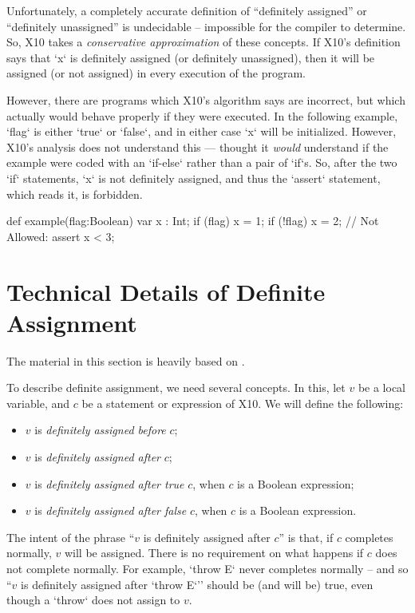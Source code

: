 Unfortunately, a completely accurate definition of ``definitely assigned''
or ``definitely unassigned'' is undecidable -- impossible for the compiler to
determine.  So, X10 takes a {\em conservative approximation} of these
concepts.  If X10's definition says that \xcd`x` is definitely assigned (or
definitely unassigned), then it will be assigned (or not assigned) in every
execution of the program.  

However, there are programs which X10's algorithm says are incorrect, but
which actually would behave properly if they were executed.   In the following
example, \xcd`flag` is either \xcd`true` or \xcd`false`, and in either case
\xcd`x` will be initialized.  However, X10's analysis does not understand this
--- thought it {\em would} understand if the example were coded with an
\xcd`if-else` rather than a pair of \xcd`if`s.  So, after the two \xcd`if`
statements, \xcd`x` is not definitely assigned, and thus the \xcd`assert`
statement, which reads it, is forbidden.  
\begin{xten}
def example(flag:Boolean) {
  var x : Int;
  if (flag) x = 1;
  if (!flag) x = 2;
  // Not Allowed: assert x < 3;
}
\end{xten}

\section{Technical Details of Definite Assignment}

The material in this section is heavily based on \cite{Java-lang-spec}.

To describe definite assignment, we need several concepts.  In this, let $v$
be a local variable, and $c$ be a statement or expression of X10.  We will define
the following: 
\begin{itemize}
\item $v$ is {\em definitely assigned before } $c$;
\item $v$ is {\em definitely assigned after } $c$;
\item $v$ is {\em definitely assigned after true } $c$, when $c$ is a Boolean expression;
\item $v$ is {\em definitely assigned after false } $c$, when $c$ is a Boolean expression.
\end{itemize}

The intent of the phrase ``$v$ is definitely assigned after $c$'' is that, if
$c$ completes normally, $v$ will be assigned.  There is no requirement on what
happens if $c$ does not complete normally.  For example, \xcd`throw E` never
completes normally -- and so ``$v$ is definitely assigned after 
\xcd`throw E`'' should be (and will be) true, even though a \xcd`throw` does not assign
to $v$. 

